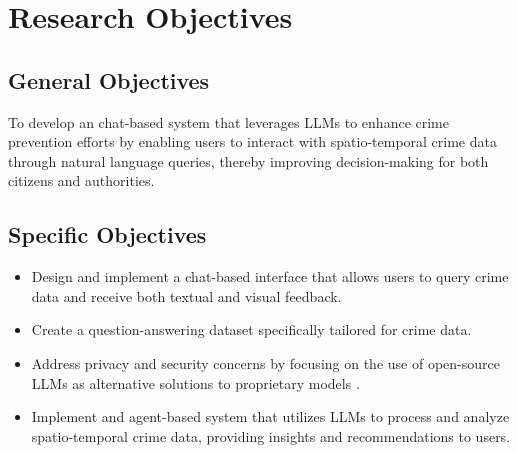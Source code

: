 \section{Research Objectives} %

\subsection{General Objectives}
To develop an chat-based system that leverages LLMs to enhance crime prevention efforts by enabling users to interact with spatio-temporal crime data through natural language queries, thereby improving decision-making for both citizens and authorities.

\subsection{Specific Objectives}
\begin{itemize}
    \item Design and implement a chat-based interface that allows users to query crime data and receive both textual and visual feedback.
    \item Create a question-answering dataset specifically tailored for crime data.
    \item Address privacy and security concerns by focusing on the use of open-source LLMs as alternative solutions to proprietary models \cite{Temsah2025DeepSeek, Ersoz2025CrimePredictionXAISurvey}. 
    \item Implement and agent-based system that utilizes LLMs to process and analyze spatio-temporal crime data, providing insights and recommendations to users.
\end{itemize}

